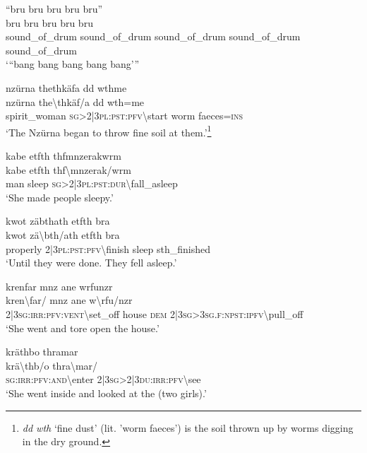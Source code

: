 \ea\label{ex:6:a1274}
``bru bru bru bru bru''\\
\gll bru	bru	bru	bru	bru\\
     sound\_of\_drum	sound\_of\_drum	sound\_of\_drum	sound\_of\_drum	sound\_of\_drum\\
\glt `{``}bang bang bang bang bang'''
\z

\newpage
\ea\label{ex:6:a1275}
nzürna thethkäfa dd wthme\\
\gll nzürna	the{\textbackslash}thkäf/a	dd	wth=me\\
     spirit\_woman	\textsc{sg}>2|3\textsc{pl}:\textsc{pst}:\textsc{pfv}{\textbackslash}start	worm	faeces=\textsc{ins}\\
\glt `The Nzürna began to throw fine soil at them.'\footnote{\textit{dd wth} `fine dust' (lit. 'worm faeces') is the soil thrown up by worms digging in the dry ground.}
\z

\ea\label{ex:6:a1276}
kabe etfth thfmnzerakwrm\\
\gll kabe	etfth	thf{\textbackslash}mnzerak/wrm\\
     man	sleep	\textsc{sg}>2|3\textsc{pl}:\textsc{pst}:\textsc{dur}{\textbackslash}fall\_asleep\\
\glt `She made people sleepy.'
\z

\ea\label{ex:6:a1277}
kwot zäbthath etfth bra\\
\gll kwot	zä{\textbackslash}bth/ath	etfth	bra\\
     properly	2|3\textsc{pl}:\textsc{pst}:\textsc{pfv}{\textbackslash}finish	sleep	sth\_finished\\
\glt `Until they were done. They fell asleep.'
\z

\ea\label{ex:6:a1279}
krenfar mnz ane wrfunzr\\
\gll kren{\textbackslash}far/	mnz	ane	w{\textbackslash}rfu/nzr\\
     2|3\textsc{sg}:\textsc{irr}:\textsc{pfv}:\textsc{vent}{\textbackslash}set\_off	house	\textsc{dem}	2|3\textsc{sg}>3\textsc{sg}.\textsc{f}:\textsc{npst}:\textsc{ipfv}{\textbackslash}pull\_off\\
\glt `She went and tore open the house.'
\z

\ea\label{ex:6:a1280}
kräthbo thramar\\
\gll krä{\textbackslash}thb/o	thra{\textbackslash}mar/\\
     \textsc{sg}:\textsc{irr}:\textsc{pfv}:\textsc{and}{\textbackslash}enter	2|3\textsc{sg}>2|3\textsc{du}:\textsc{irr}:\textsc{pfv}{\textbackslash}see\\
\glt `She went inside and looked at the (two girls).'
\z


